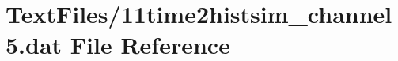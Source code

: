 \hypertarget{11time2histsim__channel5_8dat}{}\section{Text\+Files/11time2histsim\+\_\+channel5.dat File Reference}
\label{11time2histsim__channel5_8dat}
